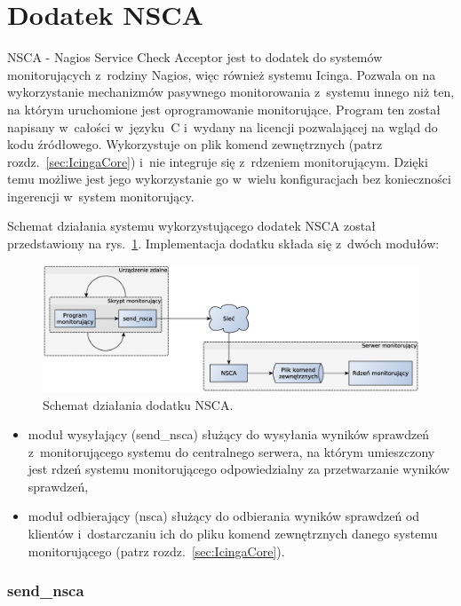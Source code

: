 \section[Dodatek NSCA][Dodatek NSCA]{Dodatek NSCA}
\label{sec:NSCA}

NSCA - Nagios Service Check Acceptor jest to dodatek do systemów
monitorujących z~rodziny Nagios, więc również systemu Icinga. Pozwala
on na wykorzystanie mechanizmów pasywnego monitorowania z~systemu
innego niż ten, na którym uruchomione jest oprogramowanie
monitorujące. Program ten został napisany w~całości w~języku~C
i~wydany na licencji pozwalającej na wgląd do kodu
źródłowego. Wykorzystuje on plik komend zewnętrznych (patrz
rozdz.~\ref{sec:IcingaCore}) i~nie integruje się z~rdzeniem
monitorującym. Dzięki temu możliwe jest jego wykorzystanie go w~wielu
konfiguracjach bez konieczności ingerencji w~system monitorujący.

Schemat działania systemu wykorzystującego dodatek NSCA
został przedstawiony na rys.~\ref{fig:nsca}. Implementacja dodatku
składa się z~dwóch modułów:

\begin{figure}[ht]
  \caption{Schemat działania dodatku NSCA.}
  \label{fig:nsca}
\includegraphics[width=1\textwidth]{img/nsca}
\end{figure}

\begin{itemize}
\item moduł wysyłający (send\_nsca) służący do wysyłania wyników
  sprawdzeń z~monitorującego systemu do centralnego serwera, na którym
  umieszczony jest rdzeń systemu monitorującego odpowiedzialny za
  przetwarzanie wyników sprawdzeń,
\item moduł odbierający (nsca) służący do odbierania wyników sprawdzeń
  od klientów i~dostarczaniu ich do pliku komend zewnętrznych danego
  systemu monitorującego (patrz rozdz.~\ref{sec:IcingaCore}).
\end{itemize}

\subsubsection[send\_nsca][send\_nsca]{send\_nsca}
\label{subsubsec:modulWysylajacy}

